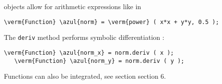{\small\tt {}} objects allow for arithmetic expressions like in

\begin{Verbatim}[commandchars=\\\{\},formatcom=\small\tt,
   baselinestretch=0.94,framesep=2mm                     ]
   \verm{Function} \azul{norm} = \verm{power} ( x*x + y*y, 0.5 );
\end{Verbatim}

The {\small\tt deriv} method performs symbolic differentiation :

\begin{Verbatim}[commandchars=\\\{\},formatcom=\small\tt,
   baselinestretch=0.94,framesep=2mm                     ]
   \verm{Function} \azul{norm_x} = norm.deriv ( x );
   \verm{Function} \azul{norm_y} = norm.deriv ( y );
\end{Verbatim}

Functions can also be integrated, see section \numb section 6.


